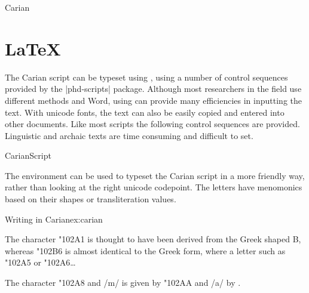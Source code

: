 \begin{scriptexample}[]{Carian}
\end{scriptexample}





\section{LaTeX}

The Carian script can be typeset using \latexe, using a number of control sequences provided by the |phd-scripts| package. Although most researchers in the field use different methods and Word, using \latexe can provide many efficiencies in inputting the text. With unicode fonts, the text can also be easily copied and entered into other documents. Like most scripts the following control sequences are provided. Linguistic and archaic texts are time consuming and difficult to set. 

\begin{docEnvironment}{CarianScript}{}
\end{docEnvironment}

The  environment can be used to typeset the Carian script in a more friendly way, rather than looking at the right
unicode codepoint. The letters have menomonics based on their shapes or transliteration values.

\newenvironment{CarianScript}[1][blue]
{
 \def\A{\color{#1}{\carian\char"102A0}\xspace}
 \let\a\A
 \def\B{{\color{#1}\carian\char"102A1}\xspace}
 \let\b\B
 \def\Uuu{{\color{#1}\carian\char"102A4}\xspace} 
 \def\R{{\color{#1}\carian\char"102A5}\xspace}
 \def\Omega{{\color{#1}\carian\char"102B6}\xspace}
 \def\lamda{{\color{#1}\carian\char"102A6}\xspace}
 \def\s{{\color{#1}\carian\char"102B0}\xspace}
 \def\q{{\color{#1}\carian\char"102A8}\xspace}
 \def\m{{\color{#1}\carian\char"102AA}\xspace}
}
{}

\begin{texexample}{Writing in Carian}{ex:carian}
\begin{CarianScript}[red]
The character \B is thought to have been derived from the Greek shaped B, whereas \Omega is almost identical to the Greek form,
where a letter such as \R or \lamda\ldots

The character \q and /m/ is given by \m and /a/ by \a.
\end{CarianScript}
\end{texexample}

